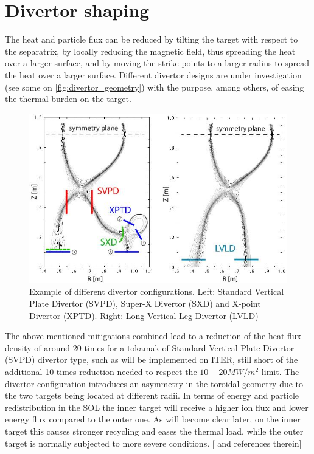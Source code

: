 \section{Divertor shaping}

The heat and particle flux can be reduced by tilting the target with respect to the separatrix, by locally reducing the magnetic field, thus spreading the heat over a larger surface, and by moving the strike points to a larger radius to spread the heat over a larger surface.
Different divertor designs are under investigation (see some on \autoref{fig:divertor_geometry}) with the purpose, among others, of easing the thermal burden on the target.

\begin{figure}[!ht]
	\centering
	\includegraphics[width=0.8\linewidth]{Chapters/chapter1/figs/divertor geometry.jpg}
	\caption{Example of different divertor configurations. Left: Standard Vertical Plate Divertor (SVPD), Super-X Divertor (SXD) and X-point Divertor (XPTD). Right: Long Vertical Leg Divertor (LVLD) \cite{Umansky2017}}
	\label{fig:divertor_geometry}
\end{figure}

The above mentioned mitigations combined lead to a reduction of the heat flux density of around 20 times for a tokamak of Standard Vertical Plate Divertor (SVPD) divertor type, such as will be implemented on ITER, still short of the additional 10 times reduction needed to respect the $10-20MW/m^2$ limit. The divertor configuration introduces an asymmetry in the toroidal geometry due to the two targets being located at different radii. In terms of energy and particle redistribution in the SOL the inner target will receive a higher ion flux and lower energy flux compared to the outer one. As will become clear later, on the inner target this causes stronger recycling and eases the thermal load, while the outer target is normally subjected to more severe conditions. [\cite{Potzel2014} and references therein]

